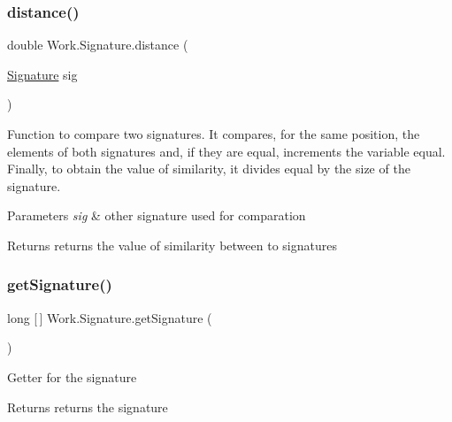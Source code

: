 \subsubsection{\texorpdfstring{distance()}{distance()}}
{\footnotesize\ttfamily double Work.\+Signature.\+distance (\begin{DoxyParamCaption}\item[{\hyperlink{classWork_1_1Signature}{Signature}}]{sig }\end{DoxyParamCaption})\hspace{0.3cm}{\ttfamily [inline]}}

Function to compare two signatures. It compares, for the same position, the elements of both signatures and, if they are equal, increments the variable equal. Finally, to obtain the value of similarity, it divides equal by the size of the signature. 
\begin{DoxyParams}{Parameters}
{\em sig} & other signature used for comparation \\
\hline
\end{DoxyParams}
\begin{DoxyReturn}{Returns}
returns the value of similarity between to signatures 
\end{DoxyReturn}
\mbox{\label{classWork_1_1Signature_aca6bfa5004179f13eda1ce04b8a74ded}} 
\subsubsection{\texorpdfstring{get\+Signature()}{getSignature()}}
{\footnotesize\ttfamily long \mbox{[}$\,$\mbox{]} Work.\+Signature.\+get\+Signature (\begin{DoxyParamCaption}{ }\end{DoxyParamCaption})\hspace{0.3cm}{\ttfamily [inline]}}

Getter for the signature \begin{DoxyReturn}{Returns}
returns the signature 
\end{DoxyReturn}
\mbox{\label{classWork_1_1Signature_a3218bc735a71d8c3cfd900484b183096}} 
